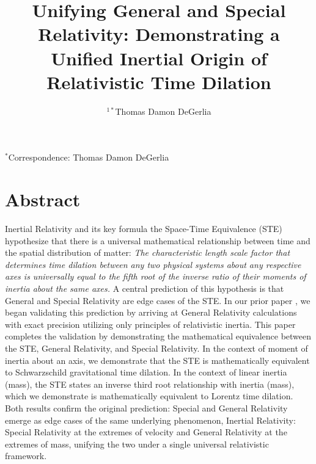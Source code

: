 \documentclass[12pt]{Definitions/academia}
\begin{document}

\title{Unifying General and Special Relativity: Demonstrating a Unified Inertial Origin of Relativistic Time Dilation}

\author{$^{1*}$Thomas Damon DeGerlia}

\maketitle


\noindent $^{*}$Correspondence: Thomas Damon DeGerlia

\section*{Abstract}
Inertial Relativity and its key formula the Space-Time Equivalence (STE)\citep{degerlia202501} hypothesize that there is a universal mathematical relationship between time and the spatial distribution of matter: \textit{The characteristic length scale factor that determines time dilation between any two physical systems about any respective axes is universally equal to the fifth root of the inverse ratio of their moments of inertia about the same axes.} A central prediction of this hypothesis is that General and Special Relativity are edge cases of the STE. In our prior paper \citep{degerlia202505}, we began validating this prediction by arriving at General Relativity calculations with exact precision utilizing only principles of relativistic inertia. This paper completes the validation by demonstrating the mathematical equivalence between the STE, General Relativity, and Special Relativity. In the context of moment of inertia about an axis, we demonstrate that the STE is mathematically equivalent to Schwarzschild gravitational time dilation. In the context of linear inertia (mass), the STE states an inverse third root relationship with inertia (mass), which we demonstrate is mathematically equivalent to Lorentz time dilation. Both results confirm the original prediction: Special and General Relativity emerge as edge cases of the same underlying phenomenon, Inertial Relativity: Special Relativity at the extremes of velocity and General Relativity at the extremes of mass, unifying the two under a single universal relativistic framework.



\end{document}
